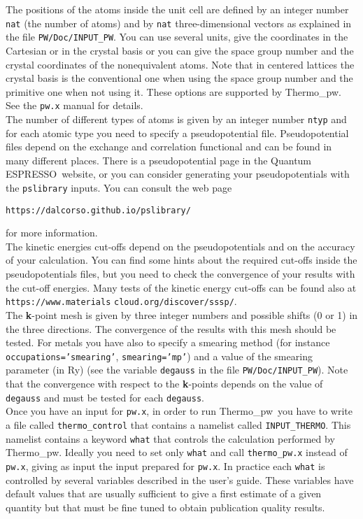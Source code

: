 \documentclass[12pt,a4paper,twoside]{report}
\def\qe{{\sc Quantum ESPRESSO}}
\def\thermo{{\sc Thermo}\_{\sc pw}}
\begin{document}
The positions of the atoms inside the unit cell are defined by an integer
number \texttt{nat} (the number of atoms) and by \texttt{nat} 
three-dimensional vectors as explained in the file \texttt{PW/Doc/INPUT\_PW}.
You can use several units, give the coordinates in the Cartesian or in the
crystal basis or you can give the space group number and the
crystal coordinates of the nonequivalent atoms. Note that in centered lattices
the crystal basis is the conventional one when using the space group number
and the primitive one when not using it.
These options are supported by \thermo. See the \texttt{pw.x} manual
for details. \\

The number of different types of atoms is given by an integer number 
\texttt{ntyp} and for each atomic type you need to specify a 
pseudopotential file. Pseudopotential files depend on the exchange and 
correlation functional and can be found in many 
different places. There is a pseudopotential page in the \qe\ website, or 
you can consider generating your pseudopotentials with the \texttt{pslibrary} 
inputs. You can consult the web page 
\begin{center}
\texttt{https://dalcorso.github.io/pslibrary/} 
\end{center}
for more information. \\

The kinetic energies cut-offs depend on the pseudopotentials
and on the accuracy of your calculation. You can 
find some hints about the required cut-offs inside the pseudopotentials files,
but you need to check the convergence of your results with the cut-off 
energies. Many tests of the kinetic energy cut-offs can be found also at 
\texttt{https://www.materials} \texttt{cloud.org/discover/sssp/}. \\

The {\bf k}-point mesh is given by three integer numbers and possible
shifts (0 or 1) in the three directions. The convergence of the results
with this mesh should be tested. For metals you have also to specify a
smearing method (for instance \texttt{occupations='smearing'}, 
\texttt{smearing='mp'}) and a value of the smearing parameter (in Ry) 
(see the variable \texttt{degauss} in the file \texttt{PW/Doc/INPUT\_PW}). 
Note that the convergence with respect to the {\bf k}-points depends on
the value of \texttt{degauss} and must be tested for each \texttt{degauss}. \\

Once you have an input for \texttt{pw.x}, in order to run \thermo\ you
have to write a file called \texttt{thermo\_control} that contains a
namelist called \texttt{INPUT\_THERMO}. This namelist contains a keyword
\texttt{what} that controls the calculation performed by 
\thermo. Ideally you need to set only \texttt{what} and call 
\texttt{thermo\_pw.x} instead of \texttt{pw.x}, giving as input the 
input prepared for \texttt{pw.x}. In practice each \texttt{what}
is controlled by several variables described in the user's guide.
These variables have default values that are usually sufficient to
give a first estimate of a given quantity but that must be fine tuned
to obtain publication quality results.
\end{document}
